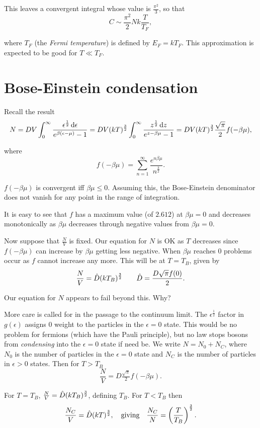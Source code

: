 \documentclass{notes}
\begin{document}
This leaves a convergent integral whose value is $\tfrac{\pi^2}{3}$, so
that
\[
C \sim \frac{\pi^2}{2} N k \frac{T}{T_F},
\]

where $T_F$ (the \emph{Fermi temperature}) is defined by
$E_F = k T_F$.  This approximation is expected to be good for
$T \ll T_F$.

\section{Bose-Einstein condensation}

Recall the result
\[
N = D  V \int_0^\infty \frac{\epsilon^{\frac{1}{2}}\, \mathrm{d} \epsilon}{
e^{\beta(\epsilon - \mu)} - 1} = D V (k T)^{\frac{3}{2}}
\int_0^\infty \frac{z^\frac{1}{2}\, \mathrm{d} z}{e^{z - \beta \mu} - 1}
= D V (k T)^{\frac{3}{2}} \frac{\sqrt{\pi}}{2} f(-\beta \mu),
\]

where
\[
f(-\beta \mu) = \sum_{n=1}^\infty \frac{e^{n \beta \mu}}{n^{\frac{3}{2}}}.
\]

$f(-\beta \mu)$ is convergent iff $\beta \mu \le 0$.  Assuming this,
the Bose-Einstein denominator does not vanish for any point in the
range of integration.

It is easy to see that $f$ has a maximum value (of $2.612$) at
$\beta \mu = 0$ and decreases monotonically as $\beta \mu$ decreases
through negative values from $\beta \mu = 0$.

Now suppose that $\tfrac{N}{V}$ is fixed.  Our equation for $N$ is OK
as $T$ decreases since $f(-\beta \mu)$ can increase by $\beta \mu$
getting less negative.  When $\beta \mu$ reaches $0$ problems occur as
$f$ cannot increase any more.  This will be at $T = T_B$, given by
\[
\frac{N}{V} = \Hat{D} ( k T_B )^{\frac{3}{2}} \qquad \Hat{D}
= \frac{D \sqrt{\pi} f(0)}{2}.
\]

Our equation for $N$ appears to fail beyond this.  Why?

More care is called for in the passage to the continuum limit.  The
$\epsilon^{\frac{1}{2}}$ factor in $g(\epsilon)$ assigns $0$ weight to
the particles in the $\epsilon = 0$ state.  This would be no problem
for fermions (which have the Pauli principle), but no law stops bosons
from \emph{condensing} into the $\epsilon = 0$ state if need be.  We
write $N = N_0 + N_C$, where $N_0$ is the number of particles in the
$\epsilon = 0$ state and $N_C$ is the number of particles in $\epsilon
> 0$ states.  Then for $T > T_B$
\[
\frac{N}{V} = D \tfrac{\sqrt{\pi}}{2} f(-\beta \mu).
\]

For $T = T_B$, $\frac{N}{V} = \Hat{D} ( k T_B)^{\frac{3}{2}}$,
defining $T_B$.  For $T < T_B$ then
\[
\frac{N_C}{V} = \Hat{D} ( k T )^{\frac{3}{2}}, \quad \text{giving}
\quad \frac{N_C}{N} = \left( \frac{T}{T_B} \right)^{\frac{3}{2}}.
\]
\end{document}
